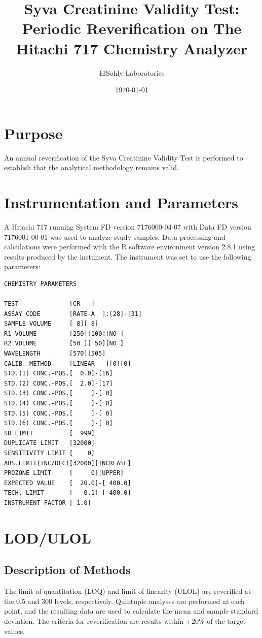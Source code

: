 \documentclass[article,11pt,oneside]{memoir}
\title{Syva Creatinine Validity Test: Periodic Reverification on The Hitachi 717 Chemistry Analyzer}
\author{ElSohly Laboratories}
\date{\today}
\begin{document}
\maketitle
\tableofcontents
\chapter{Purpose}
An annual reverification of the Syva Creatinine Validity Test is performed to establish that the analytical methodology remains valid.

\chapter{Instrumentation and Parameters}
A Hitachi 717 running System FD version 7176000-04-07 with Data FD version 7176001-00-01 was used to analyze study samples.
Data processing and calculations were performed with the R software environment version 2.8.1\cite{R-Development-Core-Team:2008th} using results produced by the instument.
The instrument was set to use the following parameters:

\begin{minipage}{3in}
\begin{verbatim}
CHEMISTRY PARAMETERS

TEST              [CR   ]
ASSAY CODE        [RATE-A  ]:[28]-[31]
SAMPLE VOLUME     [ 8][ 8]
R1 VOLUME         [250][100][NO ]
R2 VOLUME         [50 ][ 50][NO ]
WAVELENGTH        [570][505]
CALIB. METHOD     [LINEAR   ][0][0]
STD.(1) CONC.-POS.[  0.0]-[16]
STD.(2) CONC.-POS.[  2.0]-[17]
STD.(3) CONC.-POS.[     ]-[ 0]
STD.(4) CONC.-POS.[     ]-[ 0]
STD.(5) CONC.-POS.[     ]-[ 0]
STD.(6) CONC.-POS.[     ]-[ 0]
SD LIMIT          [  999]
DUPLICATE LIMIT   [32000]
SENSITIVITY LIMIT [    0]
ABS.LIMIT(INC/DEC)[32000][INCREASE]
PROZONE LIMIT     [     0][UPPER]
EXPECTED VALUE    [  20.0]-[ 400.0]
TECH. LIMIT       [  -0.1]-[ 400.0]
INSTRUMENT FACTOR [ 1.0]
\end{verbatim}
\end{minipage}

\chapter{LOD/ULOL}
\section{Description of Methods}
The limit of quantitation (LOQ) and limit of linearity (ULOL) are reverified at the 0.5 and \unit{300}{\milli\gram\per\deci\liter} levels, respectively.
Quintuple analyses are performed at each point, and the resulting data are used to calculate the mean and sample standard deviation.
The criteria for reverification are results within \(\pm 20\%\) of the target values.
\end{document}
